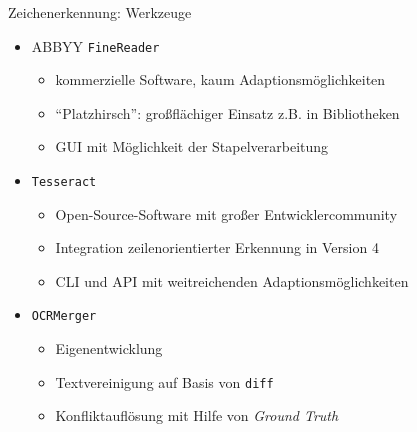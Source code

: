 \documentclass{bbawslides}
\begin{document}
\begin{bbawslide}{Zeichenerkennung: Werkzeuge}
  \vspace*{7mm}%
  \centerslidestrue%
  \begin{itemize}
    \item ABBYY \texttt{FineReader}
    \begin{itemize}\small
      \item kommerzielle Software, kaum Adaptionsmöglichkeiten
      \item \enquote{Platzhirsch}: großflächiger Einsatz z.B. in Bibliotheken
      \item GUI mit Möglichkeit der Stapelverarbeitung
    \end{itemize}
    \item \texttt{Tesseract} 
    \begin{itemize}\small
      \item Open-Source-Software mit großer Entwicklercommunity
      \item Integration zeilenorientierter Erkennung in Version 4
      \item CLI und API mit weitreichenden Adaptionsmöglichkeiten
    \end{itemize}
    \item \texttt{OCRMerger} 
    \begin{itemize}\small
      \item Eigenentwicklung
      \item Textvereinigung auf Basis von \texttt{diff}
      \item Konfliktauflösung mit Hilfe von \emph{Ground Truth}
    \end{itemize}
  \end{itemize}
\end{bbawslide}
\end{document}
